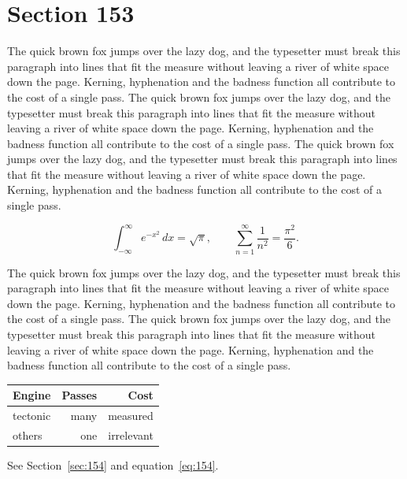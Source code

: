 \documentclass{article}
\begin{document}
\section{Section 153}
\label{sec:153}
The quick brown fox jumps over the lazy dog, and the typesetter must break this paragraph into lines that fit the measure without leaving a river of white space down the page. Kerning, hyphenation and the badness function all contribute to the cost of a single pass. The quick brown fox jumps over the lazy dog, and the typesetter must break this paragraph into lines that fit the measure without leaving a river of white space down the page. Kerning, hyphenation and the badness function all contribute to the cost of a single pass. The quick brown fox jumps over the lazy dog, and the typesetter must break this paragraph into lines that fit the measure without leaving a river of white space down the page. Kerning, hyphenation and the badness function all contribute to the cost of a single pass. 

\begin{equation}\label{eq:153}
\int_{-\infty}^{\infty} e^{-x^{2}}\,dx = \sqrt{\pi}, \qquad
\sum_{n=1}^{\infty} \frac{1}{n^{2}} = \frac{\pi^{2}}{6}.
\end{equation}

The quick brown fox jumps over the lazy dog, and the typesetter must break this paragraph into lines that fit the measure without leaving a river of white space down the page. Kerning, hyphenation and the badness function all contribute to the cost of a single pass. The quick brown fox jumps over the lazy dog, and the typesetter must break this paragraph into lines that fit the measure without leaving a river of white space down the page. Kerning, hyphenation and the badness function all contribute to the cost of a single pass. 

\begin{center}
\begin{tabular}{lrr}
\toprule
Engine & Passes & Cost \\
\midrule
tectonic & many & measured \\
others & one & irrelevant \\
\bottomrule
\end{tabular}
\end{center}

See Section~\ref{sec:154} and equation~\eqref{eq:154}.
\end{document}
